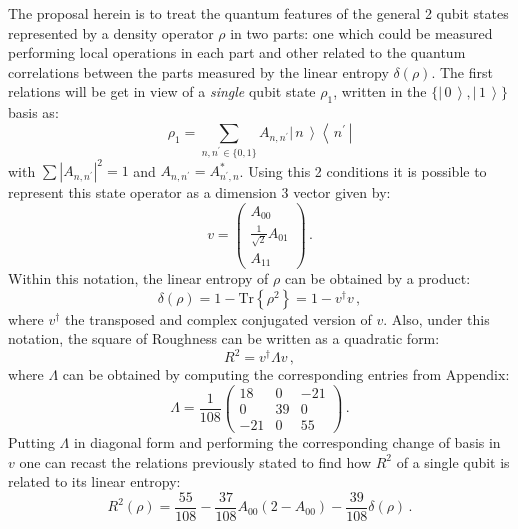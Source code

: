 \documentclass[aps,prl,preprint]{revtex4-1}
\newcommand{\ket}[1]{\ensuremath{\left|\,#1\,\right\rangle}}
\begin{document}
	The proposal herein is to treat the
	quantum features of the general 2 qubit states represented by 
	a density operator $\rho$ in two  parts: one which
	could be measured performing local operations in each part and other  related
	to the quantum correlations between the parts measured by the 
	linear entropy $\delta(\rho)$. The first relations
	will be get in view of a {\em single} qubit state $\rho_1$,
	written in the $\{\ket{0}, \ket{1}\}$ basis as:
	\begin{equation}
	\rho_1 = \sum_{n,n^{\prime }\in\{0,1\}}A_{n,n^{\prime
	}}\left|\,n\,\right\rangle \left\langle\, n^{\prime }\,\right|
	\label{rho_1qb}
	\end{equation}
	with $\sum |A_{n,n^{\prime }}|^2 =1$ and $A_{n,n^{\prime }} = A_{n^{\prime
		},n}^*$. Using  this 2 conditions it is possible to represent this state
	operator  as a dimension 3 vector given by:
	\begin{equation}
	v =
	\begin{pmatrix}
	A_{00} \\
	\frac{1}{\sqrt{2}}A_{01} \\
	A_{11}%
	\end{pmatrix}%
	\, .
	\end{equation}
	Within this notation, the linear entropy of $\rho$ can be obtained by a
	product:
	\begin{equation}
	\delta(\rho) = 1 - \mbox{Tr}\left\{ \rho^2 \right\} = 1 - v^{\dagger}v\, ,
	\end{equation}
	where $v^{\dagger}$ the transposed and complex conjugated 
	version of $v$. Also, under this notation, the square of Roughness can be  written
	as a quadratic form:
	\begin{equation}
	R^2 = v^\dagger\Lambda v\, ,
	\end{equation}
	where $\Lambda$ can be obtained by computing the corresponding  entries from
	Appendix:
	\begin{equation}
	\Lambda = \frac{1}{108}%
	\begin{pmatrix}
	18 & 0 & -21 \\
	0 & 39 & 0 \\
	-21 & 0 & 55%
	\end{pmatrix}%
	\, .
	\label{Lambda}
	\end{equation}
	Putting $\Lambda$ in diagonal form and performing the corresponding  change
	of basis in $v$ one can recast the relations previously stated  to find how 
	$R^2$ of a single qubit is related to its linear entropy:
	\begin{equation}
	R^2(\rho) = \frac{55}{108} -\frac{37}{108} A_{00} (2-A_{00}) - \frac{39}{108}
	\delta(\rho)\,.  \label{rough_delta_1d}
	\end{equation}
	
\end{document}
